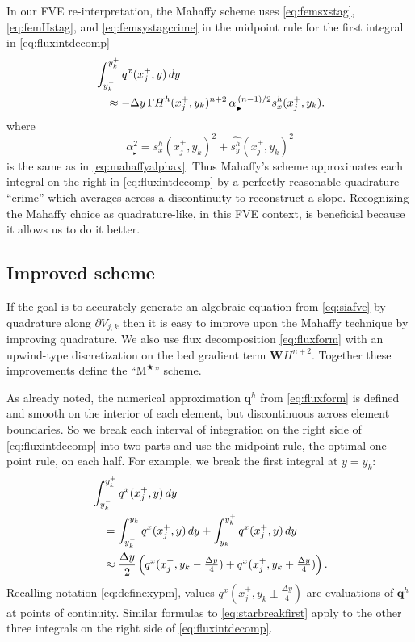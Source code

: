\documentclass[twocolumn,a4paper]{igs}
\newcommand\bq{\mathbf{q}}
\newcommand\bW{\mathbf{W}}
\newcommand{\Mstar}{$\text{M}^{\bigstar}$\xspace}
\newcommand\alpharight{\alpha_{{}_{\blacktriangleright}}}
\begin{document}
In our FVE re-interpretation, the Mahaffy scheme uses \eqref{eq:femsxstag}, \eqref{eq:femHstag}, and \eqref{eq:femsystagcrime} in the midpoint rule for the first integral in \eqref{eq:fluxintdecomp}
\begin{align}
&\int_{y_k^-}^{y_k^+} q^x(x_j^+,y)\,dy  \label{eq:femmahaffyfirstint} \\
  &\quad\approx - \Delta y\, \Gamma H^h(x_j^+,y_k)^{n+2} \,\alpharight^{\,(n-1)/2} s^h_x(x_j^+,y_k). \notag 
\end{align}
where
\begin{equation}
\alpharight^2 = s^h_x(x_j^+,y_k)^2 + \widehat{s^h_y}(x_j^+,y_k)^2
\end{equation}
is the same as in \eqref{eq:mahaffyalphax}.  Thus Mahaffy's scheme approximates each integral on the right in \eqref{eq:fluxintdecomp} by a perfectly-reasonable quadrature ``crime'' \citep[compare][]{Strang1972} which averages across a discontinuity to reconstruct a slope.  Recognizing the Mahaffy choice as quadrature-like, in this FVE context, is beneficial because it allows us to do it better.


\subsection{Improved scheme}

If the goal is to accurately-generate an algebraic equation from \eqref{eq:siafve} by quadrature along $\partial V_{j,k}$ then it is easy to improve upon the Mahaffy technique by improving quadrature.  We also use flux decomposition \eqref{eq:fluxform} with an upwind-type discretization on the bed gradient term $\bW H^{n+2}$.  Together these improvements define the ``\Mstar'' scheme.

As already noted, the numerical approximation $\bq^h$ from \eqref{eq:fluxform} is defined and smooth on the interior of each element, but discontinuous across element boundaries.  So we break each interval of integration on the right side of \eqref{eq:fluxintdecomp} into two parts and use the midpoint rule, the optimal one-point rule, on each half.  For example, we break the first integral at $y=y_k$:
\begin{align}
&\int_{y_k^-}^{y_k^+} q^x(x_j^+,y)\,dy  \label{eq:starbreakfirst} \\
  &\quad= \int_{y_k^-}^{y_k} q^x(x_j^+,y)\,dy + \int_{y_k}^{y_k^+} q^x(x_j^+,y)\,dy \notag \\
  &\quad\approx \frac{\Delta y}{2} \left(q^x(x_j^+,y_k-\tfrac{\Delta y}{4}) + q^x(x_j^+,y_k+\tfrac{\Delta y}{4})\right). \notag
\end{align}
Recalling notation \eqref{eq:definexypm}, values $q^x(x_j^+,y_k\pm\tfrac{\Delta y}{4})$ are evaluations of $\bq^h$ at points of continuity.  Similar formulas to \eqref{eq:starbreakfirst} apply to the other three integrals on the right side of \eqref{eq:fluxintdecomp}.
\end{document}
